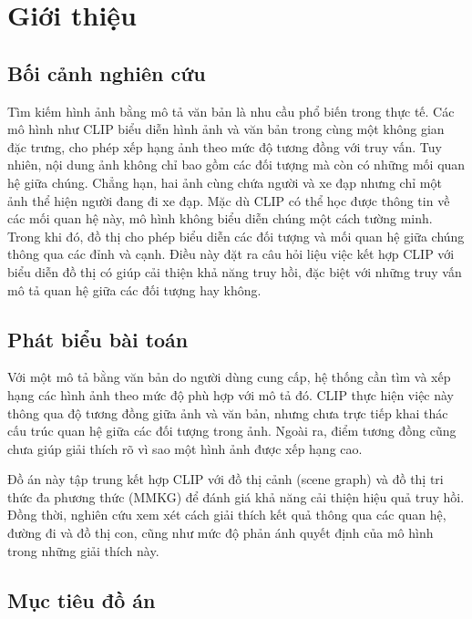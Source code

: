 \chapter{Giới thiệu}
\label{chap:introduction}

\section{Bối cảnh nghiên cứu}
\label{sec:research-background}

Tìm kiếm hình ảnh bằng mô tả văn bản là nhu cầu phổ biến trong thực tế. Các mô hình như CLIP \cite{radford2021clip} biểu diễn hình ảnh và văn bản trong cùng một không gian đặc trưng, cho phép xếp hạng ảnh theo mức độ tương đồng với truy vấn. Tuy nhiên, nội dung ảnh không chỉ bao gồm các đối tượng mà còn có những mối quan hệ giữa chúng. Chẳng hạn, hai ảnh cùng chứa người và xe đạp nhưng chỉ một ảnh thể hiện người đang đi xe đạp. Mặc dù CLIP có thể học được thông tin về các mối quan hệ này, mô hình không biểu diễn chúng một cách tường minh. Trong khi đó, đồ thị cho phép biểu diễn các đối tượng và mối quan hệ giữa chúng thông qua các đỉnh và cạnh. Điều này đặt ra câu hỏi liệu việc kết hợp CLIP với biểu diễn đồ thị có giúp cải thiện khả năng truy hồi, đặc biệt với những truy vấn mô tả quan hệ giữa các đối tượng hay không.

\section{Phát biểu bài toán}
\label{sec:problem-statement}

Với một mô tả bằng văn bản do người dùng cung cấp, hệ thống cần tìm và xếp hạng các hình ảnh theo mức độ phù hợp với mô tả đó. CLIP thực hiện việc này thông qua độ tương đồng giữa ảnh và văn bản, nhưng chưa trực tiếp khai thác cấu trúc quan hệ giữa các đối tượng trong ảnh. Ngoài ra, điểm tương đồng cũng chưa giúp giải thích rõ vì sao một hình ảnh được xếp hạng cao.

Đồ án này tập trung kết hợp CLIP với đồ thị cảnh (scene graph) và đồ thị tri thức đa phương thức (MMKG) để đánh giá khả năng cải thiện hiệu quả truy hồi. Đồng thời, nghiên cứu xem xét cách giải thích kết quả thông qua các quan hệ, đường đi và đồ thị con, cũng như mức độ phản ánh quyết định của mô hình trong những giải thích này.

\section{Mục tiêu đồ án}
\label{sec:research-objectives}

